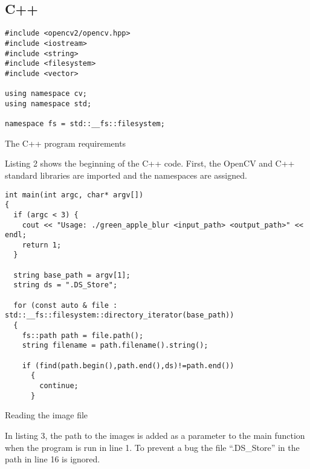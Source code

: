 \subsection{C++}

\begin{listing}[!ht]
\begin{verbatim}
#include <opencv2/opencv.hpp>
#include <iostream>
#include <string>
#include <filesystem>
#include <vector>

using namespace cv;
using namespace std;

namespace fs = std::__fs::filesystem;
\end{verbatim}
\caption{The C++ program requirements}
\label{listing:c++requirements}
\end{listing}

Listing 2 shows the beginning of the C++ code. First, the OpenCV and C++ standard libraries are imported and the namespaces are assigned.

\begin{listing}[ht]
\begin{verbatim}
int main(int argc, char* argv[])
{
  if (argc < 3) {
    cout << "Usage: ./green_apple_blur <input_path> <output_path>" << endl;
    return 1;
  }

  string base_path = argv[1];
  string ds = ".DS_Store";

  for (const auto & file : std::__fs::filesystem::directory_iterator(base_path))
  {
    fs::path path = file.path();
    string filename = path.filename().string();

    if (find(path.begin(),path.end(),ds)!=path.end())
      {
        continue;
      }

\end{verbatim}
\caption{Reading the image file}
\label{listing:c++-read}
\end{listing}

In listing 3, the path to the images is added as a parameter to the main function when the program is run in line 1. To prevent a bug the file “.DS\_Store” in the path in line 16 is ignored.

